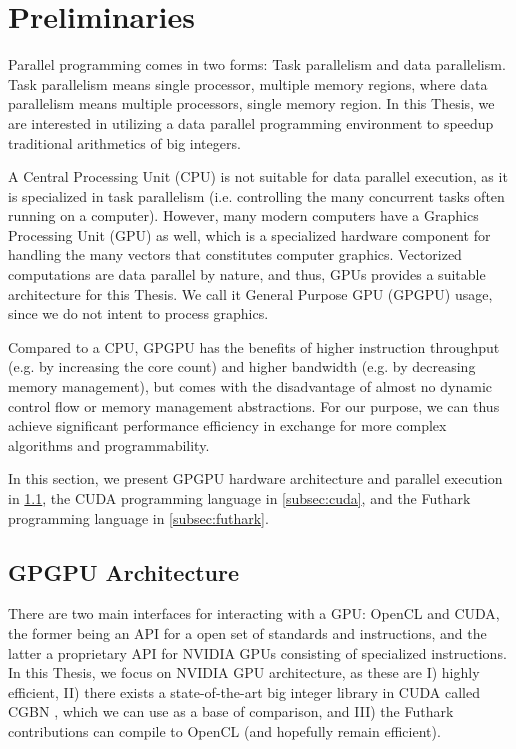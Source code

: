 \section{Preliminaries}
\label{sec:pre}
Parallel programming comes in two forms: Task parallelism and data
parallelism. Task parallelism means single processor, multiple memory regions,
where data parallelism means multiple processors, single memory region. In this
Thesis, we are interested in utilizing a data parallel programming environment
to speedup traditional arithmetics of big integers.

A Central Processing Unit (CPU) is not suitable for data parallel execution, as
it is specialized in task parallelism (i.e. controlling the many concurrent
tasks often running on a computer). However, many modern computers have a
Graphics Processing Unit (GPU) as well, which is a specialized hardware
component for handling the many vectors that constitutes computer graphics.
Vectorized computations are data parallel by nature, and thus, GPUs provides a
suitable architecture for this Thesis. We call it General Purpose GPU (GPGPU)
usage, since we do not intent to process graphics.

Compared to a CPU, GPGPU has the benefits of higher instruction throughput
(e.g. by increasing the core count) and higher bandwidth (e.g. by decreasing
memory management), but comes with the disadvantage of almost no dynamic control
flow or memory management abstractions. For our purpose, we can thus achieve
significant performance efficiency in exchange for more complex algorithms and
programmability.

In this section, we present GPGPU hardware architecture and parallel execution
in \ref{subsec:gpgpu}, the CUDA programming language in \ref{subsec:cuda}, and
the Futhark programming language in \ref{subsec:futhark}.

\subsection{GPGPU Architecture}
\label{subsec:gpgpu}

There are two main interfaces for interacting with a GPU: OpenCL and CUDA, the
former being an API for a open set of standards and instructions, and the latter
a proprietary API for NVIDIA GPUs consisting of specialized instructions. In
this Thesis, we focus on NVIDIA GPU architecture, as these are I) highly
efficient, II) there exists a state-of-the-art big integer library in CUDA
called CGBN \cite{CGBN}, which we can use as a base of comparison, and III) the
Futhark contributions can compile to OpenCL (and hopefully remain efficient).

